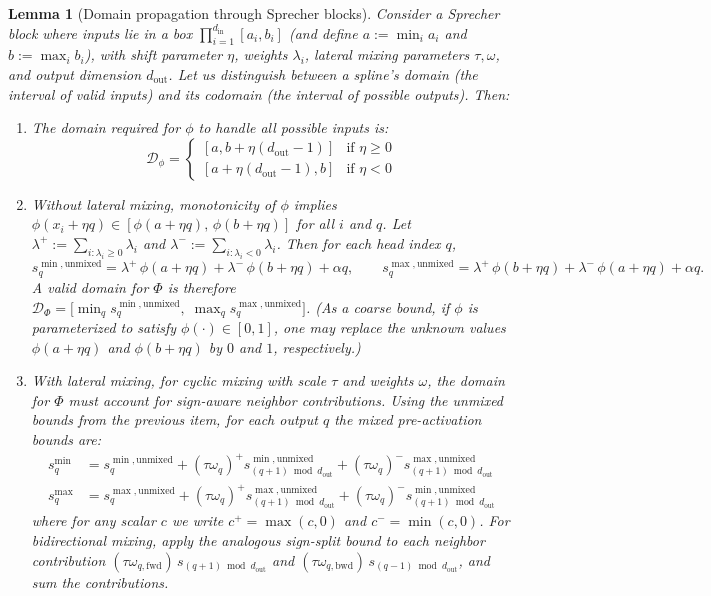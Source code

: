 \documentclass{article}
\theoremstyle{plain}
\newtheorem{lemma}{Lemma}
\theoremstyle{definition}
\theoremstyle{remark}
\begin{document}
\begin{lemma}[Domain propagation through Sprecher blocks]\label{lem:domain_prop}
Consider a Sprecher block where inputs lie in a box $\prod_{i=1}^{d_{\mathrm{in}}}[a_i,b_i]$ (and define $a:=\min_i a_i$ and $b:=\max_i b_i$), with shift parameter $\eta$, weights $\lambda_i$, lateral mixing parameters $\tau, \omega$, and output dimension $d_{\mathrm{out}}$. Let us distinguish between a spline's \emph{domain} (the interval of valid inputs) and its \emph{codomain} (the interval of possible outputs). Then:
\begin{enumerate}
\item The domain required for $\phi$ to handle all possible inputs is:
$$\mathcal{D}_\phi = \begin{cases}
[a, b + \eta(d_{\mathrm{out}}-1)] & \text{if } \eta \geq 0 \\
[a + \eta(d_{\mathrm{out}}-1), b] & \text{if } \eta < 0
\end{cases}$$

\item Without lateral mixing, monotonicity of $\phi$ implies $\phi(x_i+\eta q)\in[\phi(a+\eta q),\,\phi(b+\eta q)]$ for all $i$ and $q$. Let
$\lambda^{+}:=\sum_{i:\lambda_i\ge 0}\lambda_i$ and $\lambda^{-}:=\sum_{i:\lambda_i<0}\lambda_i$.
Then for each head index $q$,
$$
s_{q}^{\min,\mathrm{unmixed}}=\lambda^{+}\,\phi(a+\eta q)+\lambda^{-}\,\phi(b+\eta q)+\alpha q,\qquad
s_{q}^{\max,\mathrm{unmixed}}=\lambda^{+}\,\phi(b+\eta q)+\lambda^{-}\,\phi(a+\eta q)+\alpha q.
$$
A valid domain for $\Phi$ is therefore $\mathcal{D}_{\Phi}=\bigl[\min_{q}s_{q}^{\min,\mathrm{unmixed}},\;\max_{q}s_{q}^{\max,\mathrm{unmixed}}\bigr]$.
(As a coarse bound, if $\phi$ is parameterized to satisfy $\phi(\cdot)\in[0,1]$, one may replace the unknown values $\phi(a+\eta q)$ and $\phi(b+\eta q)$ by $0$ and $1$, respectively.)

\item With lateral mixing, for cyclic mixing with scale $\tau$ and weights $\omega$, the domain for $\Phi$ must account for sign-aware neighbor contributions. Using the \emph{unmixed} bounds from the previous item, for each output $q$ the mixed pre-activation bounds are:
$$\begin{aligned}
s^{\min}_q &= s^{\min,\text{unmixed}}_q + (\tau\omega_q)^+ s^{\min,\text{unmixed}}_{(q+1) \bmod d_{\mathrm{out}}} + (\tau\omega_q)^- s^{\max,\text{unmixed}}_{(q+1) \bmod d_{\mathrm{out}}}\\
s^{\max}_q &= s^{\max,\text{unmixed}}_q + (\tau\omega_q)^+ s^{\max,\text{unmixed}}_{(q+1) \bmod d_{\mathrm{out}}} + (\tau\omega_q)^- s^{\min,\text{unmixed}}_{(q+1) \bmod d_{\mathrm{out}}}
\end{aligned}$$
where for any scalar $c$ we write $c^+ = \max(c,0)$ and $c^- = \min(c,0)$. For bidirectional mixing, apply the analogous sign-split bound to each neighbor contribution $(\tau\omega_{q,\text{fwd}})\,s_{(q+1)\bmod d_{\mathrm{out}}}$ and $(\tau\omega_{q,\text{bwd}})\,s_{(q-1)\bmod d_{\mathrm{out}}}$, and sum the contributions.


\end{enumerate}
\end{lemma}
\end{document}
